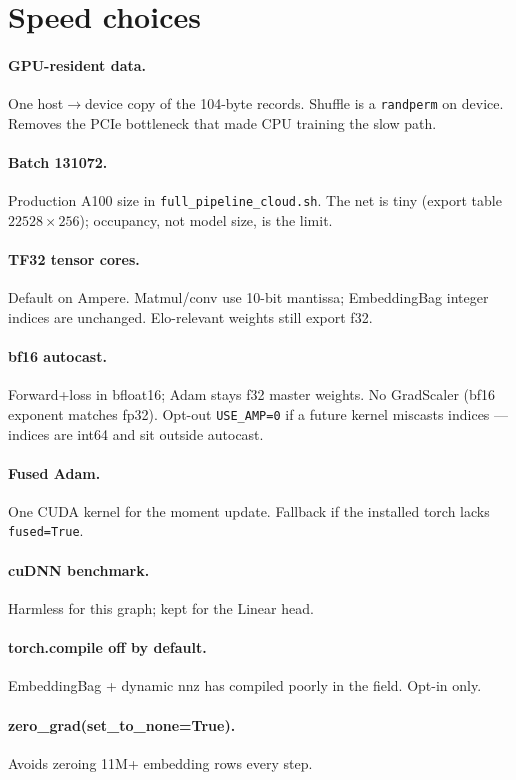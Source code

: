 \documentclass[journal,twocolumn,10pt]{IEEEtran}
\begin{document}
\section{Speed choices}
\paragraph{GPU-resident data.} One host$\to$device copy of the 104-byte records. Shuffle is a \texttt{randperm} on device. Removes the PCIe bottleneck that made CPU training the slow path.
\paragraph{Batch 131072.} Production A100 size in \texttt{full\_pipeline\_cloud.sh}. The net is tiny (export table $22528\times256$); occupancy, not model size, is the limit.
\paragraph{TF32 tensor cores.} Default on Ampere. Matmul/conv use 10-bit mantissa; EmbeddingBag integer indices are unchanged. Elo-relevant weights still export f32.
\paragraph{bf16 autocast.} Forward+loss in bfloat16; Adam stays f32 master weights. No GradScaler (bf16 exponent matches fp32). Opt-out \texttt{USE\_AMP=0} if a future kernel miscasts indices --- indices are int64 and sit outside autocast.
\paragraph{Fused Adam.} One CUDA kernel for the moment update. Fallback if the installed torch lacks \texttt{fused=True}.
\paragraph{cuDNN benchmark.} Harmless for this graph; kept for the Linear head.
\paragraph{torch.compile off by default.} EmbeddingBag + dynamic nnz has compiled poorly in the field. Opt-in only.
\paragraph{zero\_grad(set\_to\_none=True).} Avoids zeroing 11M+ embedding rows every step.
\end{document}
